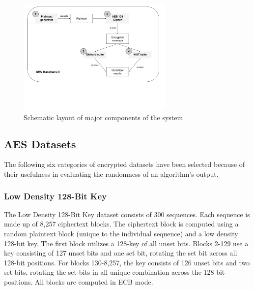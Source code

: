\documentclass[conference]{IEEEtran}
\begin{document}
\begin{figure}[H]
\centering
\includegraphics[width=3in]{imgs/HighLevelSchema.png}
\caption{Schematic layout of major components of the system}
\label{HighLevelSchema}
\end{figure}


\subsection{AES Datasets}
The following six categories of encrypted datasets have been selected because of their usefulness in evaluating the randomness of an algorithm's output.
\subsubsection{Low Density 128-Bit Key} 
 
The Low Density 128-Bit Key dataset consists of 300 sequences. Each sequence is made up of 8,257 ciphertext blocks. The ciphertext block is computed using a random plaintext block (unique to the individual sequence) and a low density 128-bit key. The first block utilizes a 128-key of all unset bits. Blocks 2-129 use a key consisting of 127 unset bits and one set bit, rotating the set bit across all 128-bit positions. For blocks 130-8,257, the key consists of 126 unset bits and two set bits, rotating the set bits in all unique combination across the 128-bit positions. All blocks are computed in ECB mode.
\end{document}
